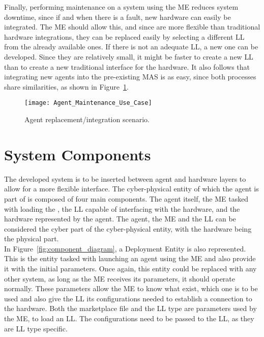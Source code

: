 Finally, performing maintenance on a system using the \acrshort{ME} reduces system downtime, since if and when there is a fault, new hardware can easily be integrated. The \acrlong{ME} should allow this, and since  are more flexible than traditional hardware integrations, they can be replaced easily by selecting a different \acrshort{LL} from the already available ones. If there is not an adequate \acrshort{LL}, a new one can be developed. Since they are relatively small, it might be faster to create a new \acrshort{LL} than to create a new traditional interface for the hardware. It also follows that integrating new agents into the pre-existing \acrshort{MAS} is as easy, since both processes share similarities, as shown in Figure~\ref{fig:agent_maintenance_use_case}.\\

\begin{figure}[h!]
	\centering
		\texttt{[image: Agent\_Maintenance\_Use\_Case]}
	\caption{Agent replacement/integration scenario.}
	\label{fig:agent_maintenance_use_case}
\end{figure}

\section{System Components}
\label{sec:system_components}

The developed system is to be inserted between agent and hardware layers to allow for a more flexible interface. The cyber-physical entity of which the agent is part of is composed of four main components. The agent itself, the \acrlong{ME} tasked with loading the , the \acrshort{LL} capable of interfacing with the hardware, and the hardware represented by the agent. The agent, the \acrshort{ME} and the \acrshort{LL} can be considered the cyber part of the cyber-physical entity, with the hardware being the physical part.\\

In Figure~\ref{fig:component_diagram}, a Deployment Entity is also represented. This is the entity tasked with launching an agent using the \acrshort{ME} and also provide it with the initial parameters. Once again, this entity could be replaced with any other system, as long as the \acrshort{ME} receives its parameters, it should operate normally. These parameters allow the \acrshort{ME} to know what  exist, which one is to be used and also give the \acrshort{LL} its configurations needed to establish a connection to the hardware. Both the marketplace file and the \acrshort{LL} type are parameters used by the \acrshort{ME}, to load an \acrshort{LL}. The configurations need to be passed to the \acrlong{LL}, as they are \acrshort{LL} type specific.\\

